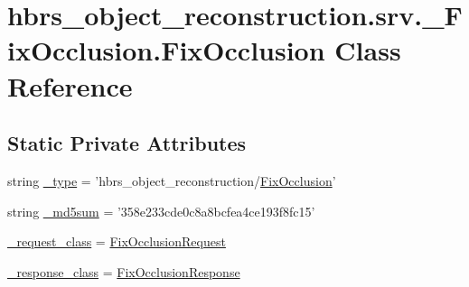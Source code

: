 \hypertarget{classhbrs__object__reconstruction_1_1srv_1_1___fix_occlusion_1_1_fix_occlusion}{\section{hbrs\-\_\-object\-\_\-reconstruction.\-srv.\-\_\-\-Fix\-Occlusion.\-Fix\-Occlusion \-Class \-Reference}
\label{classhbrs__object__reconstruction_1_1srv_1_1___fix_occlusion_1_1_fix_occlusion}
}
\subsection*{\-Static \-Private \-Attributes}
\begin{DoxyCompactItemize}
\item 
string \hyperlink{classhbrs__object__reconstruction_1_1srv_1_1___fix_occlusion_1_1_fix_occlusion_a076e9d69e63f94ff16d49bab3585128d}{\-\_\-type} = 'hbrs\-\_\-object\-\_\-reconstruction/\hyperlink{classhbrs__object__reconstruction_1_1srv_1_1___fix_occlusion_1_1_fix_occlusion}{\-Fix\-Occlusion}'
\item 
string \hyperlink{classhbrs__object__reconstruction_1_1srv_1_1___fix_occlusion_1_1_fix_occlusion_a1dac39aab4d9789d74e5a136355d106e}{\-\_\-md5sum} = '358e233cde0c8a8bcfea4ce193f8fc15'
\item 
\hyperlink{classhbrs__object__reconstruction_1_1srv_1_1___fix_occlusion_1_1_fix_occlusion_a4da8a12ff322a5ee79c2d2d2c650900e}{\-\_\-request\-\_\-class} = \hyperlink{classhbrs__object__reconstruction_1_1srv_1_1___fix_occlusion_1_1_fix_occlusion_request}{\-Fix\-Occlusion\-Request}
\item 
\hyperlink{classhbrs__object__reconstruction_1_1srv_1_1___fix_occlusion_1_1_fix_occlusion_a2e794552f41b10101b63b6793bd53f33}{\-\_\-response\-\_\-class} = \hyperlink{classhbrs__object__reconstruction_1_1srv_1_1___fix_occlusion_1_1_fix_occlusion_response}{\-Fix\-Occlusion\-Response}
\end{DoxyCompactItemize}


